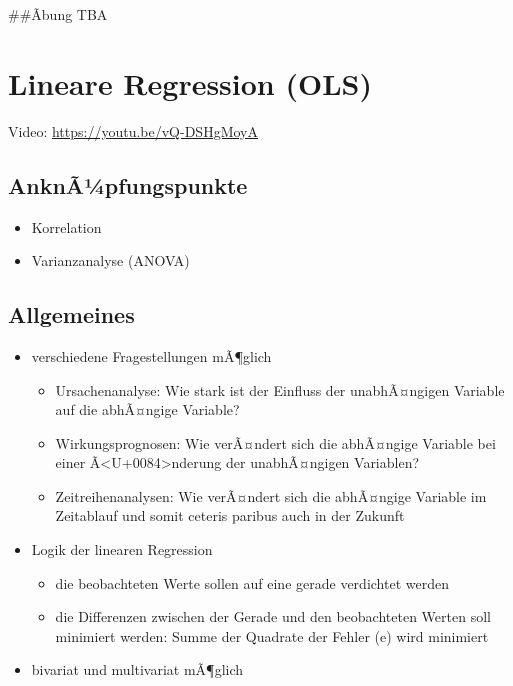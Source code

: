 \documentclass[
]{book}
\providecommand{\tightlist}{%
  \setlength{\itemsep}{0pt}\setlength{\parskip}{0pt}}
\begin{document}
\#\#Ãbung
TBA

\hypertarget{lineare-regression-ols}{%
\chapter{Lineare Regression (OLS)}\label{lineare-regression-ols}}

Video: \url{https://youtu.be/vQ-DSHgMoyA}

\hypertarget{anknuxe3uxbcpfungspunkte-3}{%
\section{AnknÃ¼pfungspunkte}\label{anknuxe3uxbcpfungspunkte-3}}

\begin{itemize}
\tightlist
\item
  Korrelation
\item
  Varianzanalyse (ANOVA)
\end{itemize}

\hypertarget{allgemeines-10}{%
\section{Allgemeines}\label{allgemeines-10}}

\begin{itemize}
\tightlist
\item
  verschiedene Fragestellungen mÃ¶glich

  \begin{itemize}
  \tightlist
  \item
    Ursachenanalyse: Wie stark ist der Einfluss der unabhÃ¤ngigen Variable auf die abhÃ¤ngige Variable?
  \item
    Wirkungsprognosen: Wie verÃ¤ndert sich die abhÃ¤ngige Variable bei einer Ã\textless U+0084\textgreater nderung der unabhÃ¤ngigen Variablen?
  \item
    Zeitreihenanalysen: Wie verÃ¤ndert sich die abhÃ¤ngige Variable im Zeitablauf und somit ceteris paribus auch in der Zukunft
  \end{itemize}
\item
  Logik der linearen Regression

  \begin{itemize}
  \tightlist
  \item
    die beobachteten Werte sollen auf eine gerade verdichtet werden
  \item
    die Differenzen zwischen der Gerade und den beobachteten Werten soll minimiert werden: Summe der Quadrate der Fehler (e) wird minimiert
  \end{itemize}
\item
  bivariat und multivariat mÃ¶glich
\end{itemize}
\end{document}
